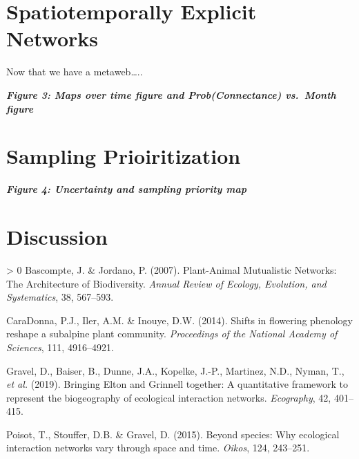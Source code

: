 \documentclass[11pt]{article}
\newlength{\cslhangindent}
\newenvironment{CSLReferences}[3] %
 {%
  \setlength{\parindent}{0pt}
  \ifodd #1 \everypar{\setlength{\hangindent}{\cslhangindent}}\ignorespaces\fi
  \ifnum #2 > 0
  \setlength{\parskip}{#2\baselineskip}
  \fi
 }%
 {}
\begin{document}
\hypertarget{spatiotemporally-explicit-networks}{%
\section{Spatiotemporally Explicit
Networks}\label{spatiotemporally-explicit-networks}}

Now that we have a metaweb\ldots..

\textbf{\emph{Figure 3: Maps over time figure and Prob(Connectance)
vs.~Month figure}}

\hypertarget{sampling-prioiritization}{%
\section{Sampling Prioiritization}\label{sampling-prioiritization}}

\textbf{\emph{Figure 4: Uncertainty and sampling priority map}}

\hypertarget{discussion}{%
\section*{Discussion}\label{discussion}}

\hypertarget{refs}{}
\begin{CSLReferences}{1}{0}
\leavevmode\hypertarget{ref-Bascompte2007PlaMut}{}%
Bascompte, J. \& Jordano, P. (2007). Plant-Animal Mutualistic Networks:
The Architecture of Biodiversity. \emph{Annual Review of Ecology,
Evolution, and Systematics}, 38, 567--593.

\leavevmode\hypertarget{ref-CaraDonna2014ShiFlo}{}%
CaraDonna, P.J., Iler, A.M. \& Inouye, D.W. (2014). Shifts in flowering
phenology reshape a subalpine plant community. \emph{Proceedings of the
National Academy of Sciences}, 111, 4916--4921.

\leavevmode\hypertarget{ref-Gravel2019BriElt}{}%
Gravel, D., Baiser, B., Dunne, J.A., Kopelke, J.-P., Martinez, N.D.,
Nyman, T., \emph{et al.} (2019). Bringing Elton and Grinnell together: A
quantitative framework to represent the biogeography of ecological
interaction networks. \emph{Ecography}, 42, 401--415.

\leavevmode\hypertarget{ref-Poisot2015SpeWhy}{}%
Poisot, T., Stouffer, D.B. \& Gravel, D. (2015). Beyond species: Why
ecological interaction networks vary through space and time.
\emph{Oikos}, 124, 243--251.

\end{CSLReferences}
\end{document}
